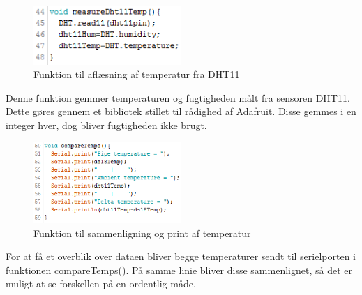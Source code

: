 \begin{figure}[h!]
  \centering
  \includegraphics[width=0.5\textwidth]{figures/kode_measure_dht11.png}
  \caption{Funktion til aflæsning af temperatur fra DHT11}
  \label{dht11Measure}
\end{figure}
Denne funktion gemmer temperaturen og fugtigheden målt fra sensoren DHT11. Dette gøres gennem et bibliotek stillet til rådighed af Adafruit.\newline
{}
Disse gemmes i en integer hver, dog bliver fugtigheden ikke brugt.

\begin{figure}[h!]
  \centering
  \includegraphics[width=0.5\textwidth]{figures/kode_compare.png}
  \caption{Funktion til sammenligning og print af temperatur}
  \label{compareTemp}
\end{figure}
For at få et overblik over dataen bliver begge temperaturer sendt til serielporten i funktionen compareTemps(). På samme linie bliver disse sammenlignet, så det er muligt at se forskellen på en ordentlig måde.



